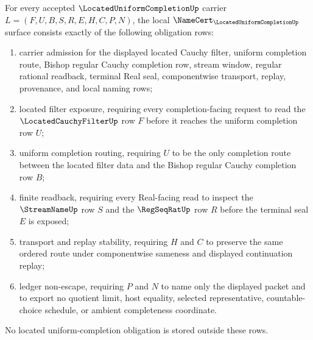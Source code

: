 \begin{theorem}\label{thm:located-uniform-completion-namecert-obligations}
For every accepted $\LocatedUniformCompletionUp$ carrier $L=(F,U,B,S,R,E,H,C,P,N)$, the local $\NameCert_{\LocatedUniformCompletionUp}$ surface consists exactly of the following obligation rows:
\begin{enumerate}
\item carrier admission for the displayed located Cauchy filter, uniform completion route, Bishop regular Cauchy completion row, stream window, regular rational readback, terminal Real seal, componentwise transport, replay, provenance, and local naming rows;
\item located filter exposure, requiring every completion-facing request to read the $\LocatedCauchyFilterUp$ row $F$ before it reaches the uniform completion row $U$;
\item uniform completion routing, requiring $U$ to be the only completion route between the located filter data and the Bishop regular Cauchy completion row $B$;
\item finite readback, requiring every Real-facing read to inspect the $\StreamNameUp$ row $S$ and the $\RegSeqRatUp$ row $R$ before the terminal seal $E$ is exposed;
\item transport and replay stability, requiring $H$ and $C$ to preserve the same ordered route under componentwise sameness and displayed continuation replay;
\item ledger non-escape, requiring $P$ and $N$ to name only the displayed packet and to export no quotient limit, host equality, selected representative, countable-choice schedule, or ambient completeness coordinate.
\end{enumerate}
No located uniform-completion obligation is stored outside these rows.
\end{theorem}
